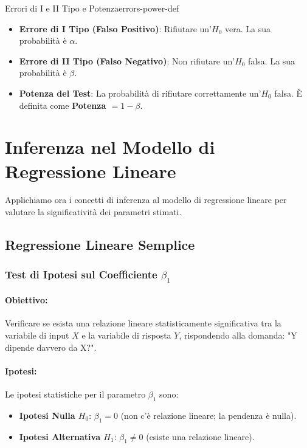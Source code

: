 \begin{definizione}{Errori di I e II Tipo e Potenza}{errors-power-def}
\begin{itemize}
    \item \textbf{Errore di I Tipo (Falso Positivo)}: Rifiutare un'$H_0$ vera. La sua probabilità è $\alpha$.
    \item \textbf{Errore di II Tipo (Falso Negativo)}: Non rifiutare un'$H_0$ falsa. La sua probabilità è $\beta$.
    \item \textbf{Potenza del Test}: La probabilità di rifiutare correttamente un'$H_0$ falsa. È definita come \textbf{Potenza $= 1 - \beta$}.
\end{itemize}
\end{definizione}


\section{Inferenza nel Modello di Regressione Lineare}

Applichiamo ora i concetti di inferenza al modello di regressione lineare per valutare la significatività dei parametri stimati.

\subsection{Regressione Lineare Semplice}

\subsubsection{\texorpdfstring{Test di Ipotesi sul Coefficiente \(\beta_1\)}{Test di Ipotesi sul Coefficiente beta1}}

\paragraph{Obiettivo:} Verificare se esista una relazione lineare statisticamente significativa tra la variabile di input \(X\) e la variabile di risposta \(Y\), rispondendo alla domanda: "Y dipende davvero da X?".

\paragraph{Ipotesi:}
Le ipotesi statistiche per il parametro \(\beta_1\) sono:
\begin{itemize}
    \item \textbf{Ipotesi Nulla $H_0$}: $\beta_1 = 0$ (non c'è relazione lineare; la pendenza è nulla).
    \item \textbf{Ipotesi Alternativa $H_1$}: $\beta_1 \neq 0$ (esiste una relazione lineare).
\end{itemize}

